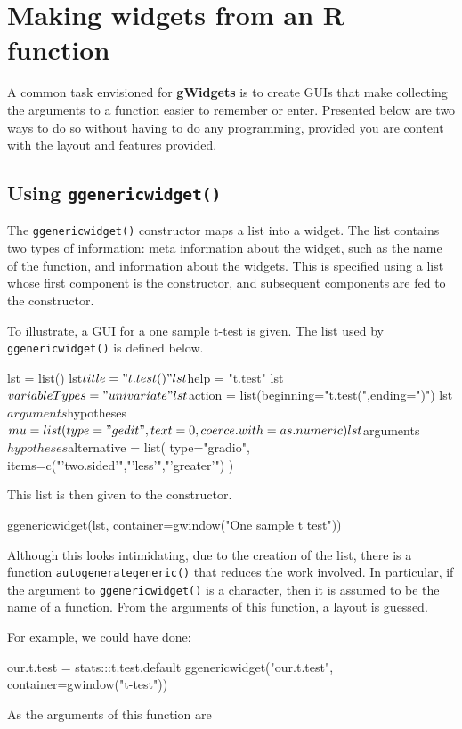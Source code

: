 \documentclass[12pt]{article}
\newcommand{\RFunc}[1]{\texttt{#1()}}
\newcommand{\RPackage}[1]{\textbf{#1}}
\begin{document}
\section{Making  widgets from an R function}

A common task envisioned for \RPackage{gWidgets} is to create GUIs
that make collecting the arguments to a function easier to remember or
enter. Presented below are two ways to do so without having to do any
programming, provided you are content with the layout and features
provided.



\subsection{Using \RFunc{ggenericwidget}}
\label{sec:using-ggenericwidget}


The \RFunc{ggenericwidget} constructor maps a list into a widget. The
list contains two types of information: meta information about the
widget, such as the name of the function, and information about the
widgets. This is specified using a list whose first component is the
constructor, and subsequent components are fed to the constructor.

To illustrate, a GUI for a one sample t-test  is given. The
list used by \RFunc{ggenericwidget}  is defined below.

\begin{Scode}
  lst = list()
  lst$title = "t.test()"
  lst$help = "t.test"
  lst$variableTypes="univariate"
  lst$action = list(beginning="t.test(",ending=")")
  lst$arguments$hypotheses$mu=list(type = "gedit",text=0,coerce.with=as.numeric)
  lst$arguments$hypotheses$alternative = list(
    type="gradio", items=c("'two.sided'","'less'","'greater'")
  )
\end{Scode}

This list is then given to the constructor.
\begin{Scode}
  ggenericwidget(lst, container=gwindow("One sample t test"))
\end{Scode}

Although this looks intimidating, due to the creation of the list,
there is a function \RFunc{autogenerategeneric} that reduces the work involved.
In particular, if the argument to \RFunc{ggenericwidget} is a
character, then it is assumed to be the name of a function. From the
arguments of this function, a layout is guessed.

For example, we could have done:
\begin{Scode}
  our.t.test = stats:::t.test.default
  ggenericwidget("our.t.test", container=gwindow("t-test"))
\end{Scode}
As the arguments of this function are 
\end{document}
